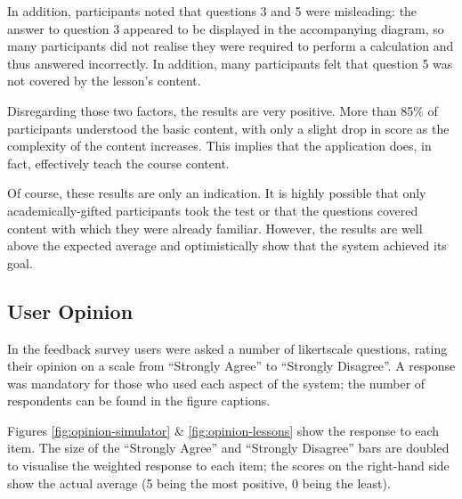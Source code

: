 \documentclass[bsc,twoside,singlespacing,parskip,logo,notimes,normalheadings]{infthesis}
\begin{document}
    In addition, participants noted that questions 3 and 5 were
    misleading: the answer to question 3 appeared to be displayed in
    the accompanying diagram, so many participants did not realise
    they were required to perform a calculation and thus answered
    incorrectly. In addition, many participants felt that question 5
    was not covered by the lesson's content.

    Disregarding those two factors, the results are very
    positive. More than 85\% of participants understood the basic
    content, with only a slight drop in score as the complexity of the
    content increases. This implies that the application does, in
    fact, effectively teach the course content.

    Of course, these results are only an indication. It is highly
    possible that only academically-gifted participants took the
    test or that the questions covered content with which they were
    already familiar. However, the results are well above the expected
    average and optimistically show that the system achieved its goal.

    \subsection{User Opinion}

    In the feedback survey users were asked a number of
    \gls{likertscale} questions, rating their opinion on a scale from
    ``Strongly Agree'' to ``Strongly Disagree''. A response was
    mandatory for those who used each aspect of the system; the number
    of respondents can be found in the figure captions.

    Figures \ref{fig:opinion-simulator} \& \ref{fig:opinion-lessons}
    show the response to each item. The size of the ``Strongly Agree''
    and ``Strongly Disagree'' bars are doubled to visualise the
    weighted response to each item; the scores on the right-hand side
    show the actual average (5 being the most positive, 0 being the
    least).
\end{document}
